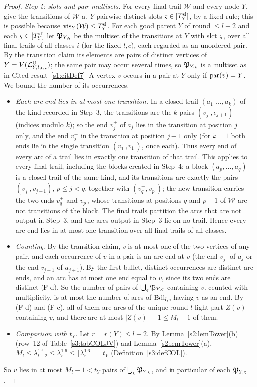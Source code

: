 \begin{proof}
\emph{Step 5: slots and pair multisets.} For every final trail $\mathcal W$ and every node $Y$, give the transitions of $\mathcal W$ at $Y$ pairwise distinct slots $\varsigma\in[T^{\mathrm{sl}}_Y]$, by a fixed rule; this is possible because $\mathrm{vis}_Y(\mathcal W)\le T^{\mathrm{sl}}_Y$. For each good parent $Y$ of round $\le l-2$ and each $\varsigma\in[T^{\mathrm{sl}}_Y]$ let $\mathfrak P_{Y,\varsigma}$ be the multiset of the transitions at $Y$ with slot $\varsigma$, over all final trails of all classes $i$ (for the fixed $l,c$), each regarded as an unordered pair. By the transition claim its elements are pairs of distinct vertices of $Y=V(\mathcal{L}^{\mathrm{U}}_{Y,l,c,\varsigma})$; the same pair may occur several times, so $\mathfrak P_{Y,\varsigma}$ is a multiset as in Cited result~\ref{s1:citDef7}. A vertex $v$ occurs in a pair at $Y$ only if $\mathrm{par}(v)=Y$. We bound the number of its occurrences.
\begin{itemize}
\item \emph{Each arc end lies in at most one transition.} In a closed trail $(a_1,\dots,a_k)$ of the kind recorded in Step~3, the transitions are the $k$ pairs $(v_j^+,v_{j+1}^-)$ (indices modulo $k$); so the end $v_j^+$ of $a_j$ lies in the transition at position $j$ only, and the end $v_j^-$ in the transition at position $j-1$ only (for $k=1$ both ends lie in the single transition $(v_1^+,v_1^-)$, once each). Thus every end of every arc of a trail lies in exactly one transition of that trail. This applies to every final trail, including the blocks created in Step~4: a block $(a_p,\dots,a_q)$ is a closed trail of the same kind, and its transitions are exactly the pairs $(v_j^+,v_{j+1}^-)$, $p\le j<q$, together with $(v_q^+,v_p^-)$; the new transition carries the two ends $v_q^+$ and $v_p^-$, whose transitions at positions $q$ and $p-1$ of $\mathcal W$ are not transitions of the block. The final trails partition the arcs that are not output in Step~3, and the arcs output in Step~3 lie on no trail. Hence every arc end lies in at most one transition over all final trails of all classes.
\item \emph{Counting.} By the transition claim, $v$ is at most one of the two vertices of any pair, and each occurrence of $v$ in a pair is an arc end at $v$ (the end $v_j^+$ of $a_j$ or the end $v_{j+1}^-$ of $a_{j+1}$). By the first bullet, distinct occurrences are distinct arc ends, and an arc has at most one end equal to $v$, since its two ends are distinct (F-d). So the number of pairs of $\bigcup_{\varsigma}\mathfrak P_{Y,\varsigma}$ containing $v$, counted with multiplicity, is at most the number of arcs of $\mathrm{Bdl}_{l,c}$ having $v$ as an end. By (F-d) and (F-c), all of them are arcs of the unique round-$l$ light part $Z(v)$ containing $v$, and there are at most $|Z(v)|-1\le M_l-1$ of them.
\item \emph{Comparison with $t_Y$.} Let $r=r(Y)\le l-2$. By Lemma~\ref{s2:lemTower}(b) (row~12 of Table~\ref{s3:tabCOLJV}) and Lemma~\ref{s2:lemTower}(a), $M_l\le\lambda_{l-2}^{1.6}\le\lambda_r^{1.6}\le\lceil\lambda_r^{1.6}\rceil=t_Y$ (Definition~\ref{s3:defCOL}).
\end{itemize}
So $v$ lies in at most $M_l-1<t_Y$ pairs of $\bigcup_{\varsigma}\mathfrak P_{Y,\varsigma}$, and in particular of each $\mathfrak P_{Y,\varsigma}$.


\end{proof}
